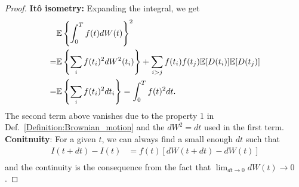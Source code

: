 \begin{proof}
\textbf{It\^{o} isometry:} Expanding the integral, we get
\begin{equation*}
\begin{aligned}
&\mathbb{E}\left\{\int_0^Tf(t)dW(t)\right\}^2\\
=&\mathbb{E}\left\{\sum_if(t_i)^2dW^2(t_i)\right\}+\sum_{i>j}f(t_i)f(t_j)\mathbb{E}[D(t_i)]\mathbb{E}[D(t_j)]\\
=&\mathbb{E}\left\{\sum_if(t_i)^2dt_i\right\}=\int_0^Tf(t)^2dt.
\end{aligned}
\end{equation*} 
The second term above vanishes due to the property 1 in Def.~\ref{Definition:Brownian_motion} and the $dW^2=dt$ used in the first term.
\textbf{Conitnuity}: For a given $t$, we can always find a small enough $dt$ such that
\begin{equation*}
\begin{aligned}
I(t+dt)-I(t)&=f(t)[dW(t+dt)-dW(t)]\\
\end{aligned}
\end{equation*}
and the continuity is the consequence from the fact that $\lim_{dt\to0}dW(t)\to 0$. 
\end{proof}